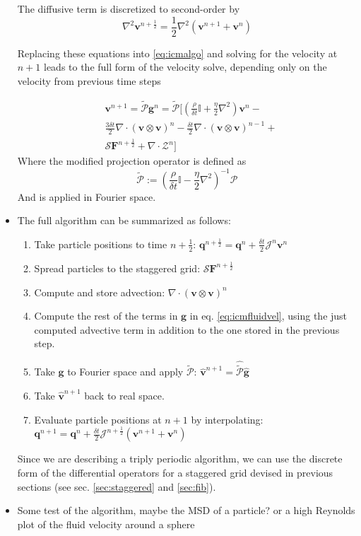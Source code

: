 \documentclass[ twoside,openright,titlepage,numbers=noenddot,%
headinclude,footinclude,cleardoublepage=empty,abstract=on,
BCOR=5mm,paper=a4,fontsize=11pt, dvipsnames
]{scrreprt}
\renewcommand{\vec}[1]{\bm{#1}}
\newcommand{\oper}[1]{\mathcal{#1}}
\newcommand{\dt}{\delta t}
\newcommand{\half}{\frac{1}{2}}
\newcommand{\fou}[1]{\widehat{#1}}
\newcommand{\ppos}{q}
\newcommand{\fvel}{v}
\begin{document}
\begin{itemize}
  The diffusive term is discretized to second-order by
  \begin{equation}
    \nabla^2\vec{\fvel}^{n+\half} = \half\nabla^2\left(\vec{\fvel}^{n+1} + \vec{\fvel}^{n}\right)
  \end{equation}

  Replacing these equations into \eqref{eq:icmalgo} and solving for the velocity at $n+1$ leads to the full form of the velocity solve, depending only on the velocity from previous time steps

  \begin{equation}
    \label{eq:icmfluidvel}
    \begin{aligned}
      &\vec{\fvel}^{n+1} = \tilde{\oper{P}}\vec{g}^n =\tilde{\oper{P}}\Big[    \left(\frac{\rho}{\dt}\mathbb{I} + \frac{\eta}{2}\nabla^2\right)\vec{\fvel}^n- \\
      & \frac{3\dt}{2} \nabla\cdot (\vec{\fvel}\otimes\vec{\fvel})^n - \frac{\dt}{2} \nabla\cdot (\vec{\fvel}\otimes\vec{\fvel})^{n-1}+\\
    &\oper{S}\vec{F}^{n+\half} + \nabla\cdot\mathcal{Z}^n \Big]
  \end{aligned}
\end{equation}
Where the modified projection operator is defined as
\begin{equation}
  \tilde{\oper{P}} :=\left(\frac{\rho}{\dt}\mathbb{I} - \frac{\eta}{2}\nabla^2\right)^{-1}\oper{P} 
\end{equation}
And is applied in Fourier space.
\item The full algorithm can be summarized as follows:
  \begin{enumerate}
  \item Take particle positions to time $n+\half$: $\vec{\ppos}^{n+\half} = \vec{\ppos}^n + \frac{\dt}{2}\oper{J}^n\vec{\fvel}^n$ 
  \item Spread particles to the staggered grid: $\oper{S}\vec{F}^{n+\half}$
  \item Compute and store advection: $\nabla\cdot (\vec{\fvel}\otimes\vec{\fvel})^n$
  \item Compute the rest of the terms in $\vec{g}$ in eq. \eqref{eq:icmfluidvel}, using the just computed advective term in addition to the one stored in the previous step.
  \item Take $\vec{g}$ to Fourier space and apply $\tilde{\oper{P}}$: $\fou{\vec{\fvel}}^{n+1} = \fou{\tilde{\oper{P}}}\fou{\vec{g}}$
  \item Take $\fou{\vec{\fvel}}^{n+1}$ back to real space.
  \item Evaluate particle positions at $n+1$ by interpolating: $\vec{\ppos}^{n+1} = \vec{\ppos}^n + \frac{\dt}{2}\oper{J}^{n+\half}\left(\vec{\fvel}^{n+1} + \vec{\fvel}^{n}\right)$
  \end{enumerate}
Since we are describing a triply periodic algorithm, we can use the discrete form of the differential operators for a staggered grid devised in previous sections (see sec. \ref{sec:staggered} and \ref{sec:fib}). 
\item Some test of the algorithm, maybe the MSD of a particle? or a high Reynolds plot of the fluid velocity around a sphere
\end{itemize}
\end{document}
